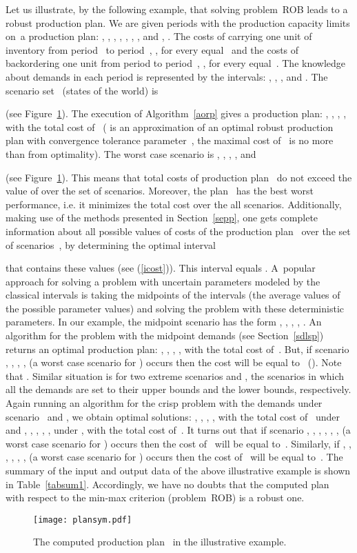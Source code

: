\documentclass[11pt]{article}
\begin{document}
Let us illustrate, by the following example, 
that solving  problem~\textsc{ROB}  leads to a robust  production
plan.   We are given  periods with 
the production capacity limits on~a production plan:
, ,  , ,
, , ,  and , .
The costs of carrying one unit
of inventory from period~ to period~, , for every
  equal~ and  
 the costs of
backordering one unit from period  to period~, , for every
  equal~.
The knowledge about
 demands in each period is represented by the intervals: , 
 ,  ,   and  .
 The scenario set~ (states of the world) is 

(see Figure~\ref{fig2}).
The execution of Algorithm~\ref{aorp} gives a  production plan:
, ,  ,
,   with the total cost of~
( is an approximation of  an optimal robust production plan with 
convergence tolerance parameter~, 
the maximal cost of~ is no more than 
from optimality).
The worst case scenario  is , 
, , , 
 and

(see Figure~\ref{fig2}).
This means that  total costs of production plan~ 
do not exceed the value of  over the set of scenarios.
Moreover,  the plan~ has the best worst performance, i.e.
it minimizes the total cost over the all scenarios. 
Additionally, making use of the methods presented in Section~\ref{sepp},
one gets  complete information about all
 possible values of costs of the production plan~
 over the set of scenarios~,
 by determining 
the optimal interval
   
 that contains
 these values (see (\ref{icost})). This interval equals .
A~popular approach for solving a problem with uncertain  parameters
 modeled by the classical intervals is taking the midpoints of the intervals (the average values of
 the possible parameter values)
 and solving the problem with these deterministic parameters.
 In our example, the midpoint scenario has the form 
 , 
, , ,
 . An algorithm for the problem with 
 the midpoint demands (see Section~\ref{sdlsp}) returns an optimal production
 plan:
 , ,  ,
,   with the total cost of~. But,
if  scenario 
, 
, , ,
  (a worst case scenario for ) occurs 
 then the cost will be equal to~ ().
 Note that .
Similar situation is for two extreme scenarios  and ,  the scenarios
  in which all the demands are set to their upper bounds and  the lower bounds, respectively.
  Again running an algorithm for the crisp problem with the demands under scenario~
  and , we obtain optimal solutions:
   , ,  ,
,   with the total cost of~ under 
and
   , ,  ,
,  , under ,
with the total cost of~. It turns out that
if  scenario 
, 
, , ,
 , , (a worst case scenario for ) occurs
 then  the cost of~  will be equal to~. Similarly,
 if 
, 
, , ,
 , ,  (a worst case scenario for ) occurs
 then  the cost of~  will be equal to~. 
 The  summary of the input and output data  of the above illustrative example
 is shown in Table~\ref{tabsum1}.
 Accordingly, we have no doubts that
the computed plan~ with respect to the
min-max criterion  (problem~\textsc{ROB}) is a robust one. 
\begin{figure}
\centering
            \texttt{[image: plansym.pdf]}
	\caption{The computed  production plan~ in the
	illustrative example.}\label{fig2}
\end{figure}
\end{document}
